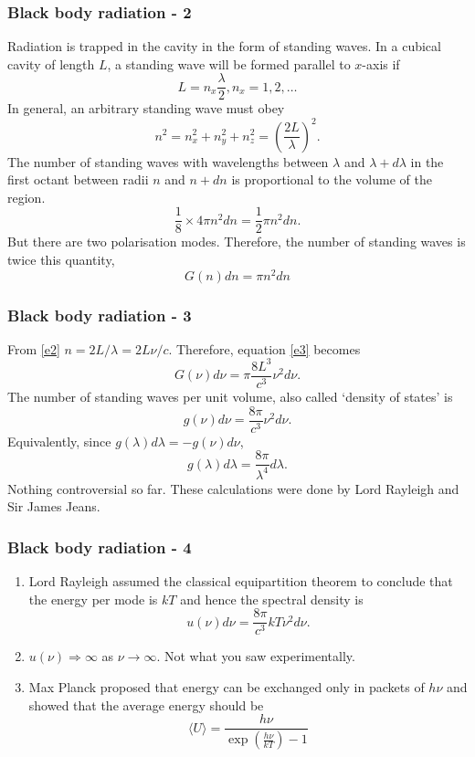 \documentclass{beamer}
\begin{document}
\begin{frame}
\frametitle{Black body radiation - 2}
Radiation is trapped in the cavity in the form of standing waves. In a cubical
cavity of length $L$, a standing wave will be formed parallel to $x$-axis if
\begin{equation}\label{e1}
L = n_x\frac{\lambda}{2}, n_x = 1, 2, \ldots
\end{equation}
In general, an arbitrary standing wave must obey 
\begin{equation}\label{e2}
n^2 = n_x^2 + n_y^2 + n_z^2 = \left(\frac{2L}{\lambda}\right)^2.
\end{equation}
The number of standing waves with wavelengths between $\lambda$ and $\lambda + 
d\lambda$ in the first octant between radii $n$ and $n + dn$ is proportional to
the volume of the region.
\[
\frac{1}{8} \times 4\pi n^2 dn = \frac{1}{2} \pi n^2 dn.
\]
But there are two polarisation modes. Therefore, the number of standing waves
is twice this quantity,
\begin{equation}\label{e3}
G(n)dn = \pi n^2dn
\end{equation}
\end{frame}

\begin{frame}
\frametitle{Black body radiation - 3}
From \eqref{e2} $n = 2L/\lambda = 2L\nu/c$. Therefore, equation \eqref{e3} 
becomes
\begin{equation}\label{e4}
G(\nu)d\nu = \pi \frac{8L^3}{c^3}\nu^2 d\nu.
\end{equation}
The number of standing waves per unit volume, also called `density of states'
is
\begin{equation}\label{e5}
g(\nu)d\nu = \frac{8\pi}{c^3}\nu^2 d\nu.
\end{equation}
Equivalently, since $g(\lambda)d\lambda = -g(\nu)d\nu$,
\begin{equation}\label{e6}
g(\lambda)d\lambda = \frac{8\pi}{\lambda^4} d\lambda.
\end{equation}
Nothing controversial so far. These calculations were done by Lord Rayleigh
and Sir James Jeans.
\end{frame}

\begin{frame}
\frametitle{Black body radiation - 4}
\begin{enumerate}
\item Lord Rayleigh assumed the classical equipartition theorem to conclude that
the energy per mode is $kT$ and hence the spectral density is
\begin{equation}\label{e7}
u(\nu)d\nu = \frac{8\pi}{c^3} kT \nu^2 d\nu.
\end{equation}
\item $u(\nu) \Rightarrow \infty$ as $\nu \rightarrow \infty$. Not what you 
saw experimentally.
\item Max Planck proposed that energy can be exchanged only in packets of
$h\nu$ and showed that the average energy should be
\begin{equation}\label{e8}
\langle U \rangle = \frac{h\nu}{\exp\left(\frac{h\nu}{kT}\right) - 1}
\end{equation} 
\end{enumerate}
\end{frame}
\end{document}
